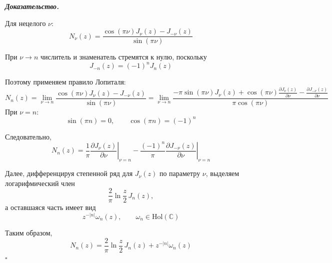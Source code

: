 \documentclass[11pt,a4paper]{report}
\numberwithin{equation}{section}
\numberwithin{figure}{chapter}
\numberwithin{table}{chapter}
\newenvironment{myproof}{%
    \begin{tcolorbox}[mathphysblock,colframe=proofcolor!65,colback=proofcolor!2,boxrule=0.5pt]
    \textit{\textbf{Доказательство.}}\par\smallskip
}{%
    \hfill$\square$
    \end{tcolorbox}
}
\newcommand{\C}{\mathbb{C}}
\begin{document}
\begin{myproof}

Для нецелого $\nu$:
\[
N_\nu(z)
=
\frac{
\cos(\pi\nu)J_\nu(z)
-
J_{-\nu}(z)
}{
\sin(\pi\nu)
}
\]

При $\nu\to n$ числитель и знаменатель стремятся к нулю, поскольку
\[
J_{-n}(z)=(-1)^nJ_n(z)
\]

Поэтому применяем правило Лопиталя:
\[
N_n(z)
=
\lim_{\nu\to n}
\frac{
\cos(\pi\nu)J_\nu(z)
-
J_{-\nu}(z)
}{
\sin(\pi\nu)
}
=
\lim_{\nu\to n}
\frac{
-\pi\sin(\pi\nu)J_\nu(z)
+
\cos(\pi\nu)
\frac{\partial J_\nu(z)}{\partial\nu}
-
\frac{\partial J_{-\nu}(z)}{\partial\nu}
}{
\pi\cos(\pi\nu)
}\]
При $\nu=n$:
\[
\sin(\pi n)=0,
\qquad
\cos(\pi n)=(-1)^n
\]

Следовательно,
\[
N_n(z)
=
\frac1\pi
\left.
\frac{\partial J_\nu(z)}{\partial\nu}
\right|_{\nu=n}
-
\frac{(-1)^n}{\pi}
\left.
\frac{\partial J_{-\nu}(z)}{\partial\nu}
\right|_{\nu=n}
\]

Далее, дифференцируя степенной ряд для $J_\nu(z)$ по параметру $\nu$,
выделяем логарифмический член
\[
\frac{2}{\pi}
\ln\frac z2\,J_n(z),
\]
а оставшаяся часть имеет вид
\[
z^{-|n|}\omega_n(z),
\qquad
\omega_n\in\mathrm{Hol}(\C)
\]

Таким образом,
\[
N_n(z)
=
\frac{2}{\pi}
\ln\frac z2\,J_n(z)
+
z^{-|n|}\omega_n(z)
\]
\end{myproof}
\end{document}
